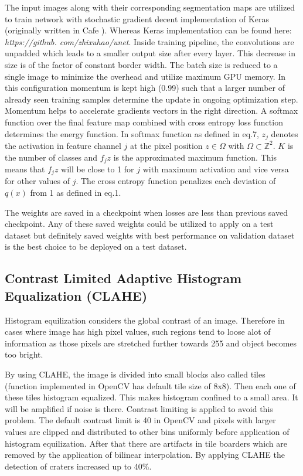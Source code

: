 \documentclass[11pt]{article}
\begin{document}
The input images along with their corresponding segmentation maps are utilized to train network with stochastic gradient decent implementation of Keras (originally written in Cafe \cite{ronneberger2015u}). Whereas Keras implementation can be found here:
\textit{https://github.
com/zhixuhao/unet}. Inside training pipeline, the convolutions are unpadded which leads to a smaller output size after every layer. This decrease in size is of the factor of constant border width. The batch size is reduced to a single image to minimize the overhead and utilize maximum GPU memory. In this configuration momentum is kept high (0.99) such that a larger number of already seen training samples determine the update in ongoing optimization step. Momentum helps to accelerate gradients vectors in the right direction. A softmax function over the final feature map combined with cross entropy loss function determines the energy function. In softmax function as defined in eq.7, $z_{j}$ denotes the activation in feature channel $j$ at the pixel position $z \in \Omega$ with $\Omega \subset \mathbb{Z}^{2}$. $K$ is the number of classes and $f_jz$ is the approximated maximum function. This means that $f_jz$ will be close to 1 for $j$ with maximum activation and vice versa for other values of $j$. The cross entropy function penalizes each deviation of $q(x)$ from 1 as defined in eq.1.

The weights are saved in a checkpoint when losses are less than previous saved checkpoint. Any of these saved weights could be utilized to apply on a test dataset but definitely saved weights with best performance on validation dataset is the best choice to be deployed on a test dataset.

\subsection{Contrast Limited Adaptive Histogram Equalization (CLAHE)}
Histogram equilization considers the global contrast of an image. Therefore in cases where image has high pixel values, such regions tend to loose alot of information as those pixels are stretched further towards 255 and object becomes too bright. 

By using CLAHE, the image is divided into small blocks also called tiles (function implemented in OpenCV has default tile size of 8x8). Then each one of these tiles histogram equalized. This makes histogram confined to a small area. It will be amplified if noise is there. Contrast limiting is applied to avoid this problem. The default contrast limit is 40 in OpenCV and pixels with larger values are clipped and distributed to other bins uniformly before application of histogram equilization. After that there are artifacts in tile boarders which are removed by the application of bilinear interpolation.
By applying CLAHE the detection of craters increased up to 40\%. 
\end{document}
